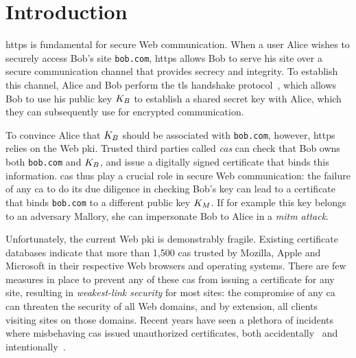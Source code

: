 \section{Introduction}
\label{sec:intro}


\acs{https} is fundamental for secure Web communication. When a user Alice
wishes to securely access Bob's site \texttt{bob.com}, \ac{https} allows Bob to
serve his site over a secure communication channel that provides secrecy and
integrity. To establish this channel, Alice and Bob perform the \ac{tls}
handshake protocol~\cite{rfc5246}, which allows Bob to use his public key
$K_B$ to establish a shared secret key with Alice, which they can subsequently
use for encrypted communication.

To convince Alice that $K_B$ should be associated with
\texttt{bob.com}, however, \ac{https} relies on the Web \ac{pki}. Trusted
third parties called \emph{\acp{ca}} can check that Bob owns both
\texttt{bob.com} and $K_B$, and issue a digitally signed certificate that
binds this information. \acp{ca} thus play a crucial role in secure Web
communication: the failure of any \ac{ca} to do its due diligence in checking
Bob's key can lead to a certificate that binds \texttt{bob.com} to a
different public key $K_M$. If for example this key belongs to an adversary
Mallory, she can impersonate Bob to Alice in a \emph{\ac{mitm} attack}.

Unfortunately, the current Web \ac{pki} is demonstrably fragile. Existing
certificate databases indicate that more than 1,500 \acp{ca} trusted by Mozilla,
Apple and Microsoft in their respective Web browsers and operating systems.
There are few measures in place to prevent any of these \acp{ca} from issuing a
certificate for any site, resulting in \emph{weakest-link security} for most
sites: the compromise of any \ac{ca} can threaten the security of all Web
domains, and by extension, all clients visiting sites on those domains. Recent
years have seen a plethora of incidents where misbehaving \acp{ca} issued
unauthorized certificates, both accidentally~\cite{sleevi2015sustaining} and
intentionally~\cite{valsorda2015komodia}.


